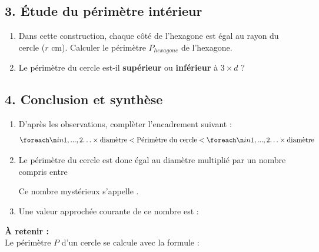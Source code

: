 \documentclass[a4paper]{book}
\begin{document}
    
    \subsection*{3. Étude du périmètre intérieur}
    \begin{enumerate}
        \item Dans cette construction, chaque côté de l'hexagone est égal au rayon du cercle ($r$ cm). Calculer le périmètre $P_{hexagone}$ de l'hexagone.
        
        \dotfill
        
        \item Le périmètre du cercle est-il \textbf{supérieur} ou \textbf{inférieur} à $3 \times d$ ?

        \dotfill
    \end{enumerate}
    
    
    \subsection*{4. Conclusion et synthèse}
    \begin{enumerate}
        \item D'après les observations, complèter l'encadrement suivant :
        \[ \points[2] \times \text{diamètre} < \text{Périmètre du cercle} < \points[2] \times \text{diamètre} \]
        
        \item Le périmètre du cercle est donc égal au diamètre multiplié par un nombre compris entre \points[5]

        \medskip
        
        Ce nombre mystérieux s'appelle \points[6].

        \medskip
        
        \item Une valeur approchée courante de ce nombre est : \points[6]
    \end{enumerate}
    
    \vspace{1cm}
    \begin{center}
        \textbf{À retenir :} \\
        Le périmètre $P$ d'un cercle se calcule avec la formule : \\

    \end{center}
\end{document}
